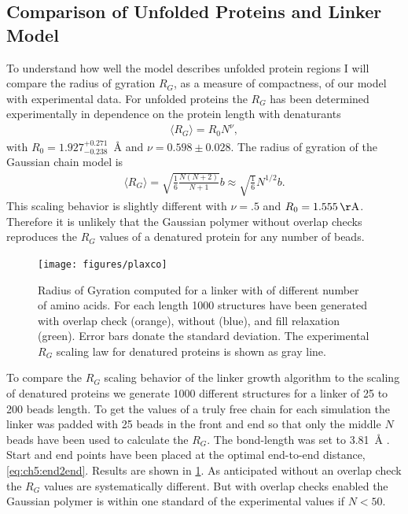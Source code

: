 \documentclass[12pt, twoside]{report}
\begin{document}
\subsection{Comparison of Unfolded Proteins and Linker Model} To understand
how well the model describes unfolded protein regions I will compare the radius
of gyration $R_G$, as a measure of compactness, of our model with experimental
data. For unfolded proteins the $R_G$ has been determined experimentally in
dependence on the protein length with denaturants \cite{Kohn2004}
\begin{align}
  \label{eq:ch5:plaxco} \langle R_G\rangle = R_0 N^{\nu},
\end{align} with \(R_0=1.927_{-0.238}^{+0.271}\)\SI{}{\AA} and \(\nu=0.598 \pm
0.028\). The radius of gyration of the Gaussian chain model is
\begin{align}
\label{eq:ch5:rg} \langle R_G\rangle = \sqrt{\frac{1}{6} \frac{N (N+2)}{N+1}} b
\approx \sqrt{\frac{1}{6}} N^{1/2} b.
\end{align} This scaling behavior is slightly different with \(\nu=.5\) and
\(R_0=\SI{1.555}{\AA}\). Therefore it is unlikely that the Gaussian polymer
without overlap checks reproduces the $R_G$ values of a denatured protein for
any number of beads.
\begin{figure}[!ht]
  \centering \texttt{[image: figures/plaxco]}
  \caption[Radius of gyration of Gaussian polymer chain for different chain
  lengths.]{Radius of Gyration computed for a linker with of different number of
    amino acids. For each length 1000 structures have been generated with
    overlap check (orange), without (blue), and fill relaxation (green). Error
    bars donate the standard deviation. The experimental $R_G$ scaling law for
    denatured proteins \cite{Kohn2004} is shown as gray line.}
\label{fig:plaxco}
\end{figure} To compare the \(R_G\) scaling behavior of the linker growth
algorithm to the scaling of denatured proteins we generate 1000 different
structures for a linker of 25 to 200 beads length. To get the values of a truly
free chain for each simulation the linker was padded with 25 beads in the front
and end so that only the middle $N$ beads have been used to calculate the $R_G$.
The bond-length was set to \SI{3.81}{\AA} \cite{Best2005}. Start and end points
have been placed at the optimal end-to-end distance, \cref{eq:ch5:end2end}.
Results are shown in \cref{fig:plaxco}. As anticipated without an overlap check
the $R_G$ values are systematically different. But with overlap checks enabled
the Gaussian polymer is within one standard of the experimental values if
$N<50$.
\end{document}
